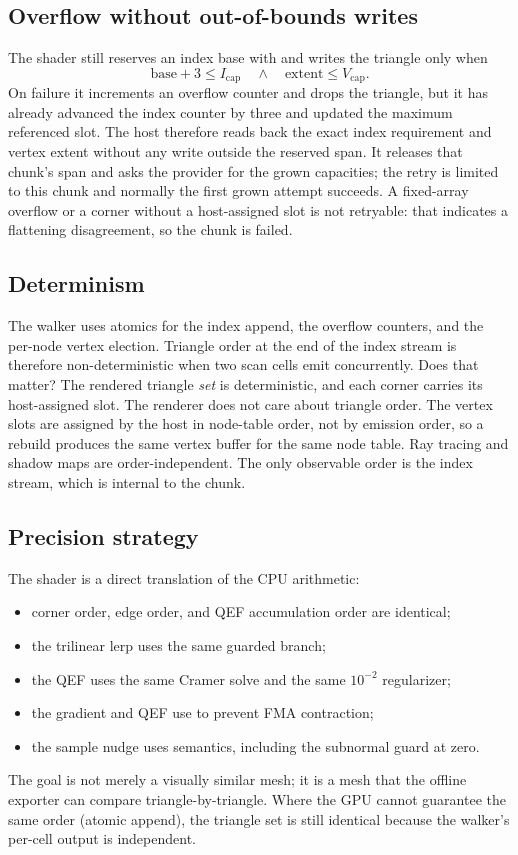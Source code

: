 \subsection{Overflow without out-of-bounds writes}

The shader still reserves an index base with  and writes the
triangle only when
\begin{equation}
  \text{base}+3 \le I_{\text{cap}}
  \quad\land\quad
  \text{extent} \le V_{\text{cap}}.
\end{equation}
On failure it increments an overflow counter and drops the triangle, but it
has already advanced the index counter by three and updated the maximum
referenced slot.  The host therefore reads back the exact index requirement
and vertex extent without any write outside the reserved span.  It releases
that chunk's span and asks the provider for the grown capacities; the retry
is limited to this chunk and normally the first grown attempt succeeds.  A
fixed-array overflow or a corner without a host-assigned slot is not
retryable: that indicates a flattening disagreement, so the chunk is
failed.

\subsection{Determinism}

The walker uses atomics for the index append, the overflow counters, and
the per-node vertex election.  Triangle order at the end of the index
stream is therefore non-deterministic when two scan cells emit
concurrently.  Does that matter?  The rendered triangle \emph{set} is
deterministic, and each corner carries its host-assigned slot.  The
renderer does not care about triangle order.  The vertex slots are assigned
by the host in node-table order, not by emission order, so a rebuild
produces the same vertex buffer for the same node table.  Ray tracing and
shadow maps are order-independent.  The only observable order is the
index stream, which is internal to the chunk.

\subsection{Precision strategy}

The shader is a direct translation of the CPU arithmetic:
\begin{itemize}
\item corner order, edge order, and QEF accumulation order are identical;
\item the trilinear lerp uses the same guarded branch;
\item the QEF uses the same Cramer solve and the same $10^{-2}$ regularizer;
\item the gradient and QEF use  to prevent FMA contraction;
\item the sample nudge uses  semantics, including the
  subnormal guard at zero.
\end{itemize}
The goal is not merely a visually similar mesh; it is a mesh that the
offline exporter can compare triangle-by-triangle.  Where the GPU cannot
guarantee the same order (atomic append), the triangle set is still
identical because the walker's per-cell output is independent.
